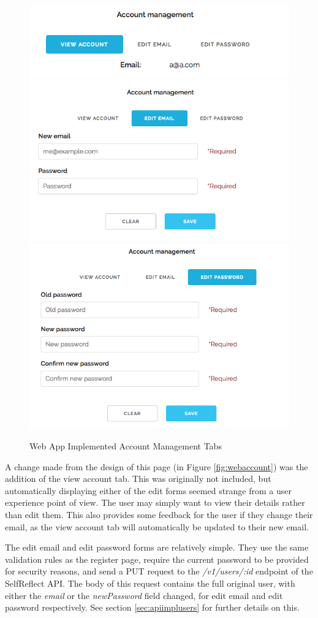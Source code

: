 \documentclass[11pt,openright,a4paper]{report}
\begin{document}
\begin{figure}[ht]
\centering
\caption{Web App Implemented Account Management Tabs}
\includegraphics[width=.48\textwidth]{i/webaccountviewtab.png} \\
\includegraphics[width=.48\textwidth]{i/webaccountemailtab.png} \hfill
\includegraphics[width=.48\textwidth]{i/webaccountpasswordtab.png}
\label{fig:webaccounttabs}
\end{figure}

\newpage
A change made from the design of this page (in Figure \ref{fig:webaccount}) was the addition of the view account tab. This was originally not included, but automatically displaying either of the edit forms seemed strange from a user experience point of view. The user may simply want to view their details rather than edit them. This also provides some feedback for the user if they change their email, as the view account tab will automatically be updated to their new email.

The edit email and edit password forms are relatively simple. They use the same validation rules as the register page, require the current password to be provided for security reasons, and send a PUT request to the \emph{/v1/users/:id} endpoint of the SelfReflect API. The body of this request contains the full original user, with either the \emph{email} or the \emph{newPassword} field changed, for edit email and edit password respectively. See section \ref{sec:apiimplusers} for further details on this.
\end{document}
